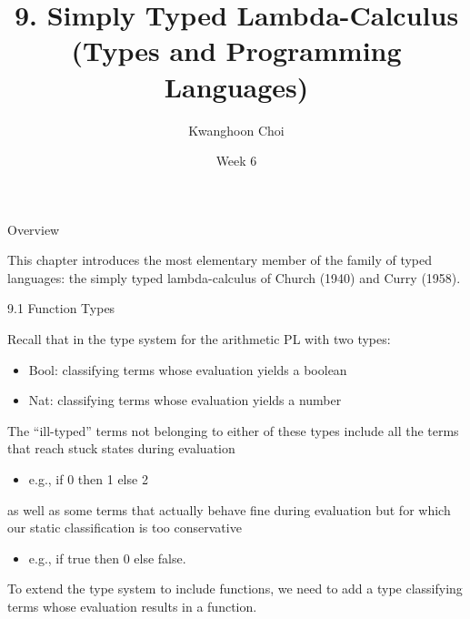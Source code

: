 \documentclass[table]{beamer}
\title[Types and Programming Languages]{9. Simply Typed Lambda-Calculus \\
(Types and Programming Languages)}
\author[K. Choi]{Kwanghoon Choi}
\institute[Chonnam National University]{
Software Languages and Systems Laboratory \\
	Chonnam National University}
\date{Week 6}
\begin{document}
\begin{frame}
	\titlepage
	
\end{frame}


\begin{frame}[t]{Overview} \vspace{10pt}

This chapter introduces the most elementary member of the family of typed languages: the simply typed lambda-calculus of Church (1940) and Curry (1958).

\end{frame}

\begin{frame}[t]{9.1 Function Types} \vspace{10pt}

Recall that in the type system for the arithmetic PL with two types:
\begin{itemize}
\item Bool: classifying terms whose evaluation yields a boolean
\item Nat: classifying terms whose evaluation yields a number
\end{itemize}

\vspace{10pt}

The ``ill-typed'' terms not belonging to either of these types include all the terms that reach stuck states during evaluation
\begin{itemize}
\item e.g., if 0 then 1 else 2
\end{itemize}
as well as some terms that actually behave fine during evaluation but for which our static classification is too conservative
\begin{itemize}
\item e.g., if true then 0 else false.
\end{itemize}

\vspace{10pt}

To extend the type system to include functions, we need to add a type classifying terms whose evaluation results in a function.

\end{frame}
\end{document}
